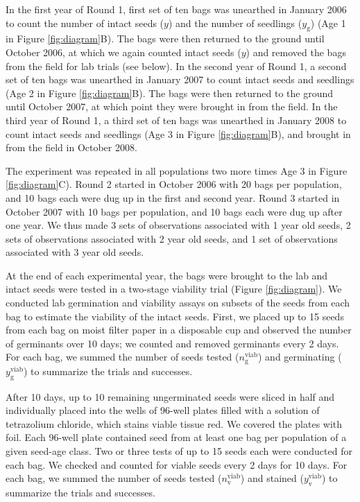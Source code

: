 \documentclass[12pt, oneside, titlepage]{article}   	%
\begin{document}
In the first year of Round 1, first set of ten bags was unearthed in January 2006 to count the number of intact seeds ($y$) and the number of seedlings ($y_{\mathrm{g}}$) (Age 1 in Figure \ref{fig:diagram}B). The bags were then returned to the ground until October 2006, at which we again counted intact seeds ($y$) and removed the bags from the field for lab trials (see below). In the second year of Round 1, a second set of ten bags was unearthed in January 2007 to count intact seeds and seedlings (Age 2 in Figure \ref{fig:diagram}B). The bags were then returned to the ground until October 2007, at which point they were brought in from the field. In the third year of Round 1, a third set of ten bags was unearthed in January 2008 to count intact seeds and seedlings (Age 3 in Figure \ref{fig:diagram}B), and brought in from the field in October 2008. 

The experiment was repeated in all populations two more times Age 3 in Figure \ref{fig:diagram}C). Round 2 started in October 2006 with 20 bags per population, and 10 bags each were dug up in the first and second year. Round 3 started in October 2007 with 10 bags per population, and 10 bags each were dug up after one year. We thus made 3 sets of observations associated with 1 year old seeds, 2 sets of observations associated with 2 year old seeds, and 1 set of observations associated with 3 year old seeds. 

At the end of each experimental year, the bags were brought to the lab and intact seeds were tested in a two-stage viability trial (Figure \ref{fig:diagram}). We conducted lab germination and viability assays on subsets of the seeds from each bag to estimate the viability of the intact seeds. First, we placed up to 15 seeds from each bag on moist filter paper in a disposable cup and observed the number of germinants over 10 days; we counted and removed germinants every 2 days. For each bag, we summed the number of seeds tested ($n^\mathrm{viab}_{\mathrm{g}}$) and germinating ($y^{\mathrm{viab}}_{\mathrm{g}}$) to summarize the trials and successes. 

After 10 days, up to 10 remaining ungerminated seeds were sliced in half and individually placed into the wells of 96-well plates filled with a solution of tetrazolium chloride, which stains viable tissue red. We covered the plates with foil. Each 96-well plate contained seed from at least one bag per population of a given seed-age class. Two or three tests of up to 15 seeds each were conducted for each bag. We checked and counted for viable seeds  every 2 days for 10 days. For each bag, we summed the number of seeds tested ($n^\mathrm{viab}_{\mathrm{v}}$) and stained ($y^{\mathrm{viab}}_{\mathrm{v}}$) to summarize the trials and successes. 
\end{document}
